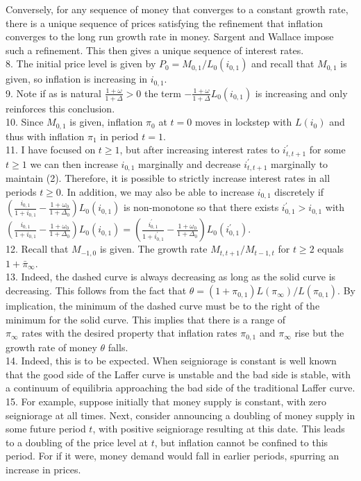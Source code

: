 \documentclass[10pt]{article}
\begin{document}
Conversely, for any sequence of money that converges to a constant growth rate, there is a unique sequence of prices satisfying the refinement that inflation converges to the long run growth rate in money. Sargent and Wallace impose such a refinement. This then gives a unique sequence of interest rates.\\
8. The initial price level is given by $P_{0}=M_{0,1} / L_{0}\left(i_{0,1}\right)$ and recall that $M_{0,1}$ is given, so inflation is increasing in $i_{0,1}$.\\
9. Note if as is natural $\frac{1+\omega}{1+\Delta}>0$ the term $-\frac{1+\omega}{1+\Delta} L_{0}\left(i_{0,1}\right)$ is increasing and only reinforces this conclusion.\\
10. Since $M_{0,1}$ is given, inflation $\pi_{0}$ at $t=0$ moves in lockstep with $L\left(i_{0}\right)$ and thus with inflation $\pi_{1}$ in period $t=1$.\\
11. I have focused on $t \geq 1$, but after increasing interest rates to $i_{t, t+1}^{\prime}$ for some $t \geq 1$ we can then increase $i_{0,1}$ marginally and decrease $i_{t, t+1}^{\prime}$ marginally to maintain (2). Therefore, it is possible to strictly increase interest rates in all periods $t \geq 0$. In addition, we may also be able to increase $i_{0,1}$ discretely if $\left(\frac{i_{0,1}}{1+i_{0,1}}-\frac{1+\omega_{0}}{1+\Delta_{0}}\right) L_{0}\left(i_{0,1}\right)$ is non-monotone so that there exists $i_{0,1}^{\prime}>i_{0,1}$ with $\left(\frac{i_{0,1}}{1+i_{0,1}}-\frac{1+\omega_{0}}{1+\Delta_{0}}\right) L_{0}\left(i_{0,1}\right)=\left(\frac{i_{0,1}^{\prime}}{1+i_{0,1}^{\prime}}-\frac{1+\omega_{0}}{1+\Delta_{0}}\right) L_{0}\left(i_{0,1}^{\prime}\right)$.\\
12. Recall that $M_{-1,0}$ is given. The growth rate $M_{t, t+1} / M_{t-1, t}$ for $t \geq 2$ equals $1+\bar{\pi}_{\infty}$.\\
13. Indeed, the dashed curve is always decreasing as long as the solid curve is decreasing. This follows from the fact that $\theta=\left(1+\pi_{0,1}\right) L\left(\pi_{\infty}\right) / L\left(\pi_{0,1}\right)$. By implication, the minimum of the dashed curve must be to the right of the minimum for the solid curve. This implies that there is a range of\\
$\pi_{\infty}$ rates with the desired property that inflation rates $\pi_{0,1}$ and $\pi_{\infty}$ rise but the growth rate of money $\theta$ falls.\\
14. Indeed, this is to be expected. When seigniorage is constant is well known that the good side of the Laffer curve is unstable and the bad side is stable, with a continuum of equilibria approaching the bad side of the traditional Laffer curve.\\
15. For example, suppose initially that money supply is constant, with zero seigniorage at all times. Next, consider announcing a doubling of money supply in some future period $t$, with positive seigniorage resulting at this date. This leads to a doubling of the price level at $t$, but inflation cannot be confined to this period. For if it were, money demand would fall in earlier periods, spurring an increase in prices.
\end{document}

